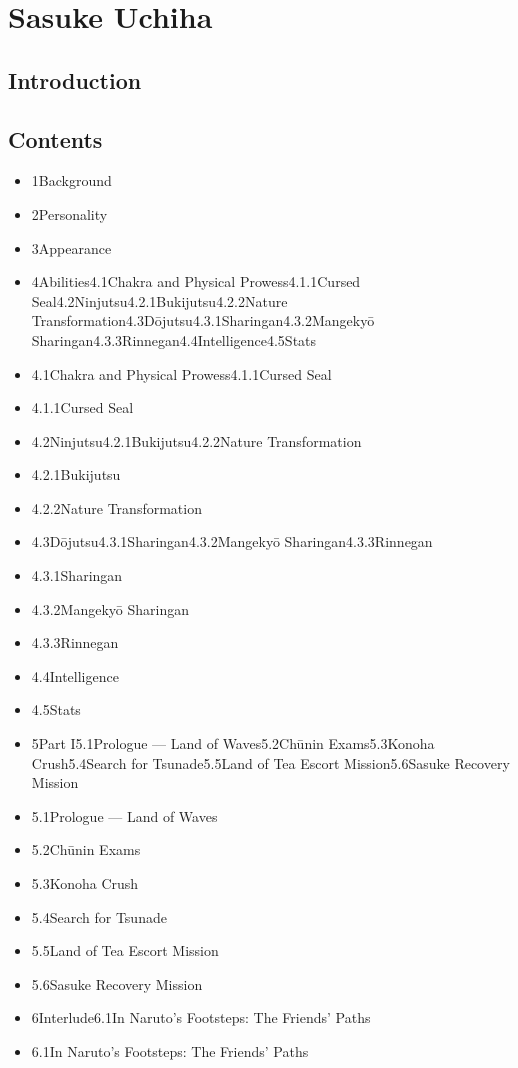 \documentclass[a4paper,12pt]{article}
\begin{document}
\section*{ Sasuke Uchiha}

\subsection*{Introduction}\n\n\subsection*{Contents}\n\n\begin{itemize}
\item 1Background
\item 2Personality
\item 3Appearance
\item 4Abilities4.1Chakra and Physical Prowess4.1.1Cursed Seal4.2Ninjutsu4.2.1Bukijutsu4.2.2Nature Transformation4.3Dōjutsu4.3.1Sharingan4.3.2Mangekyō Sharingan4.3.3Rinnegan4.4Intelligence4.5Stats
\item 4.1Chakra and Physical Prowess4.1.1Cursed Seal
\item 4.1.1Cursed Seal
\item 4.2Ninjutsu4.2.1Bukijutsu4.2.2Nature Transformation
\item 4.2.1Bukijutsu
\item 4.2.2Nature Transformation
\item 4.3Dōjutsu4.3.1Sharingan4.3.2Mangekyō Sharingan4.3.3Rinnegan
\item 4.3.1Sharingan
\item 4.3.2Mangekyō Sharingan
\item 4.3.3Rinnegan
\item 4.4Intelligence
\item 4.5Stats
\item 5Part I5.1Prologue — Land of Waves5.2Chūnin Exams5.3Konoha Crush5.4Search for Tsunade5.5Land of Tea Escort Mission5.6Sasuke Recovery Mission
\item 5.1Prologue — Land of Waves
\item 5.2Chūnin Exams
\item 5.3Konoha Crush
\item 5.4Search for Tsunade
\item 5.5Land of Tea Escort Mission
\item 5.6Sasuke Recovery Mission
\item 6Interlude6.1In Naruto's Footsteps: The Friends' Paths
\item 6.1In Naruto's Footsteps: The Friends' Paths

\end{itemize}
\end{document}
